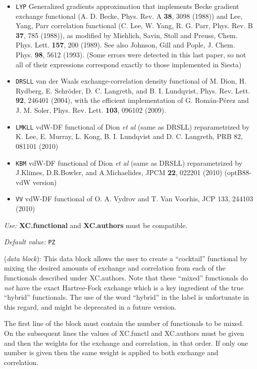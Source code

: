 \documentclass[11pt]{article}
\begin{document}
\begin{description}
\begin{itemize}
\item {\tt LYP} Generalized gradients approximation 
that implements Becke gradient exchange functional (A. D.
Becke, Phys. Rev. A {\bf 38}, 3098 (1988)) and Lee, Yang, Parr
correlation functional (C. Lee, W. Yang, R. G. Parr, Phys. Rev. B
{\bf 37}, 785 (1988)), as modified by Miehlich, Savin, Stoll and Preuss,
Chem. Phys. Lett. {\bf 157}, 200 (1989). See also Johnson, Gill and Pople,
J. Chem. Phys. {\bf 98}, 5612 (1993). (Some errors were detected in this
last paper, so not all of their expressions correspond exactly to those
implemented in {\sc Siesta})
\item {\tt DRSLL} van der Waals exchange-correlation density functional of
M. Dion, H. Rydberg, E. Schr\"{o}der, D. C. Langreth, and B. I. Lundqvist,
Phys. Rev. Lett. {\bf 92}, 246401 (2004), with the efficient implementation of 
G. Rom\'an-P\'erez and J. M. Soler, Phys. Rev. Lett. {\bf 103},  096102 (2009).
\item {\tt LMKLL} vdW-DF functional of Dion {\it et al} (same as DRSLL)
reparametrized by K. Lee, E. Murray, L. Kong, B. I. Lundqvist and 
D. C. Langreth, PRB 82, 081101 (2010)
\item {\tt KBM} vdW-DF  functional of Dion {\it et al} (same as DRSLL)
reparametrized by J.Klimes, D.R.Bowler, and A.Michaelides, 
JPCM {\bf 22}, 022201 (2010) (optB88-vdW version)
\item {\tt VV} vdW-DF  functional of O. A. Vydrov and T. Van Voorhis, 
JCP 133, 244103 (2010)

\end{itemize}

{\it Use:} {\bf XC.functional} and {\bf XC.authors} must be compatible.

{\it Default value:} {\tt PZ}

\item[{\bf XC.hybrid}] ({\it data block}):
This data block allows the user to create a ``cocktail'' functional by
mixing the desired amounts of exchange and correlation from each of
the functionals described under XC.authors. Note that these ``mixed''
functionals do {\em not} have the exact Hartree-Fock exchange which
is a key ingredient of the true ``hybrid'' functionals. The use of
the word ``hybrid'' in the label is unfortunate in this regard, and
might be deprecated in a future version.

The first line of the block must contain the number of functionals to
be mixed. On the subsequent lines the values of XC.functl and
XC.authors must be given and then the weights for the exchange and
correlation, in that order. If only one number is given then the same
weight is applied to both exchange and correlation.


\end{description}
\end{document}
